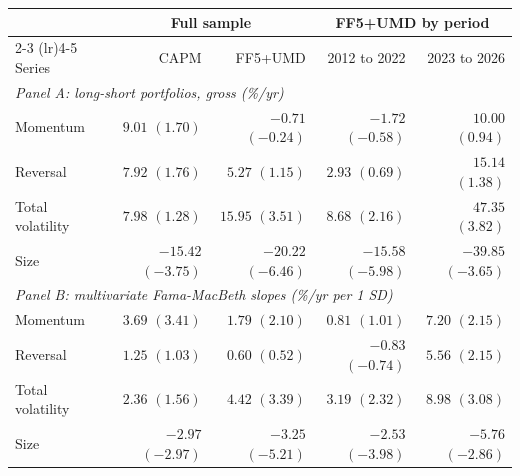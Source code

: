 \begin{tabular}{lrrrr}
\toprule
& \multicolumn{2}{c}{Full sample} & \multicolumn{2}{c}{FF5+UMD by period} \\
\cmidrule(lr){2-3} \cmidrule(lr){4-5}
Series & CAPM & FF5+UMD & 2012 to 2022 & 2023 to 2026 \\
\midrule
\multicolumn{5}{l}{\textit{Panel A: long-short portfolios, gross (\%/yr)}} \\
Momentum & $9.01$ $(1.70)$ & $-0.71$ $(-0.24)$ & $-1.72$ $(-0.58)$ & $10.00$ $(0.94)$ \\
Reversal & $7.92$ $(1.76)$ & $5.27$ $(1.15)$ & $2.93$ $(0.69)$ & $15.14$ $(1.38)$ \\
Total volatility & $7.98$ $(1.28)$ & $15.95$ $(3.51)$ & $8.68$ $(2.16)$ & $47.35$ $(3.82)$ \\
Size & $-15.42$ $(-3.75)$ & $-20.22$ $(-6.46)$ & $-15.58$ $(-5.98)$ & $-39.85$ $(-3.65)$ \\
\multicolumn{5}{l}{\textit{Panel B: multivariate Fama-MacBeth slopes (\%/yr per 1 SD)}} \\
Momentum & $3.69$ $(3.41)$ & $1.79$ $(2.10)$ & $0.81$ $(1.01)$ & $7.20$ $(2.15)$ \\
Reversal & $1.25$ $(1.03)$ & $0.60$ $(0.52)$ & $-0.83$ $(-0.74)$ & $5.56$ $(2.15)$ \\
Total volatility & $2.36$ $(1.56)$ & $4.42$ $(3.39)$ & $3.19$ $(2.32)$ & $8.98$ $(3.08)$ \\
Size & $-2.97$ $(-2.97)$ & $-3.25$ $(-5.21)$ & $-2.53$ $(-3.98)$ & $-5.76$ $(-2.86)$ \\
\bottomrule
\end{tabular}
